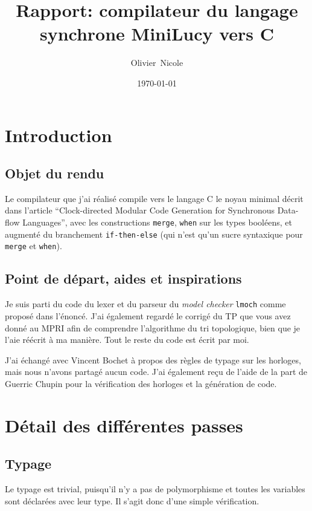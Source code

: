 \documentclass{article}
\title{Rapport: compilateur du langage synchrone MiniLucy vers C}
\author{Olivier~Nicole}
\date{\today}
\begin{document}
\maketitle

\section{Introduction}

\subsection{Objet du rendu}

Le compilateur que j'ai réalisé compile vers le langage C le noyau minimal
décrit dans l'article ``Clock-directed Modular Code Generation for Synchronous
Data-flow Languages'', avec les constructions \verb/merge/, \verb/when/ sur
les types booléens, et augmenté du branchement \verb/if-then-else/ (qui n'est
qu'un sucre syntaxique pour \verb/merge/ et \verb/when/).

\subsection{Point de départ, aides et inspirations}

Je suis parti du code du lexer et du parseur du \textit{model checker}
\verb/lmoch/ comme proposé dans l'énoncé. J'ai également regardé le corrigé du
TP que vous avez donné au MPRI afin de comprendre l'algorithme du tri
topologique, bien que je l'aie réécrit à ma manière. Tout le reste du code est
écrit par moi.

J'ai échangé avec Vincent Bochet à propos des règles de typage sur les horloges,
mais nous n'avons partagé aucun code. J'ai également reçu de l'aide de la part
de Guerric Chupin pour la vérification des horloges et la génération de code.

\section{Détail des différentes passes}

\subsection{Typage}

Le typage est trivial, puisqu'il n'y a pas de polymorphisme et toutes
les variables sont déclarées avec leur type. Il s'agit donc d'une simple
vérification.
\end{document}
